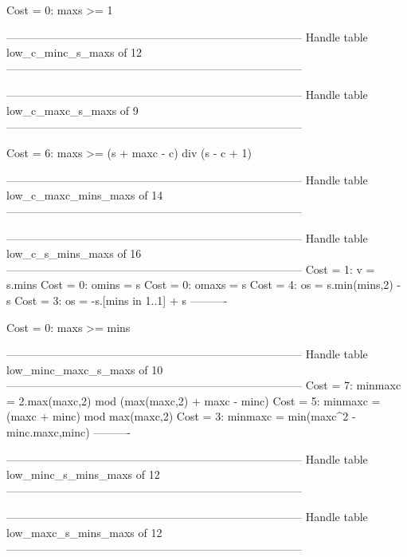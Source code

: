 Cost =  0:  maxs >= 1

--------------------------------------------------------------------------------
Handle table low_c_minc_s_maxs of 12
--------------------------------------------------------------------------------


--------------------------------------------------------------------------------
Handle table low_c_maxc_s_maxs of 9
--------------------------------------------------------------------------------

Cost =  6:  maxs >= (s + maxc - c) div (s - c + 1)

--------------------------------------------------------------------------------
Handle table low_c_maxc_mins_maxs of 14
--------------------------------------------------------------------------------


--------------------------------------------------------------------------------
Handle table low_c_s_mins_maxs of 16
--------------------------------------------------------------------------------
Cost =  1:  v     = s.mins
Cost =  0:  omins = s
Cost =  0:  omaxs = s
Cost =  4:  os    = s.min(mins,2) - s
Cost =  3:  os    = -s.[mins in 1..1] + s
----------

Cost =  0:  maxs >= mins

--------------------------------------------------------------------------------
Handle table low_minc_maxc_s_maxs of 10
--------------------------------------------------------------------------------
Cost =  7:  minmaxc = 2.max(maxc,2) mod (max(maxc,2) + maxc - minc)
Cost =  5:  minmaxc = (maxc + minc) mod max(maxc,2)
Cost =  3:  minmaxc = min(maxc^2 - minc.maxc,minc)
----------


--------------------------------------------------------------------------------
Handle table low_minc_s_mins_maxs of 12
--------------------------------------------------------------------------------


--------------------------------------------------------------------------------
Handle table low_maxc_s_mins_maxs of 12
--------------------------------------------------------------------------------

